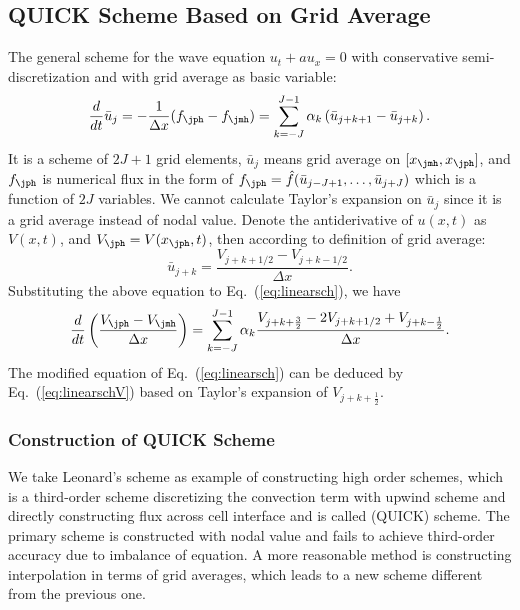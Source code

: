 \documentclass[]{article}
\begin{document}
\subsection{QUICK Scheme Based on Grid Average} \label{sec:quick-scheme-based}

The general scheme for the wave equation $u_t+a u_x=0$ with
conservative semi-discretization and with grid average as basic variable:
\begin{equation}
  \frac{d}{dt}\bar u_j = -\frac{1}{\Delta x}(f_{\jph}-f_{\jmh})=\sum_{k=-J}^{J-1}\alpha_k\left(\bar u_{j+k+1}-\bar u_{j+k}\right).
  \label{eq:linearsch}
\end{equation}
It is a scheme of $2J+1$ grid elements, $\bar u_j$ means grid
average on $[x_{\jmh}, x_\jph]$, and $f_\jph$ is numerical flux in the
form of $f_{\jph} = \hat f(\bar u_{j-J+1},\ldots,\bar u_{j+J})$ which
is a function of $2J$ variables.
We cannot calculate Taylor's expansion on $\bar u_j$ since it is a
grid average instead of nodal value. Denote the antiderivative of
$u(x,t)$ as $V(x,t)$, and $V_\jph = V(x_\jph,t)$, then according to
definition of grid average:
\begin{equation}
  \bar u_{j+k}=\frac{V_{j+k+1/2}-V_{j+k-1/2}}{\Delta x}.
  \label{eq:ujkV}
\end{equation}
Substituting the above equation to Eq.~(\ref{eq:linearsch}), we have 
\begin{equation}
  \frac{d}{dt}\left(\frac{V_{\jph}-V_{\jmh}}{\Delta x}\right)=\sum_{k=-J}^{J-1}\alpha_k\frac{V_{j+k+\frac{3}{2}}-2V_{j+k+1/2}+V_{j+k-\frac{1}{2}}}{\Delta x}.
  \label{eq:linearschV}
\end{equation}
The modified equation of Eq.~(\ref{eq:linearsch}) can be deduced by
Eq.~(\ref{eq:linearschV}) based on Taylor's expansion of $V_{j+k+\frac 12}$.

\subsubsection{Construction of QUICK Scheme} \label{sec:construct-quick}

We take Leonard's scheme \cite{leonard1979stable}
as example of constructing high order schemes, which is a third-order scheme
discretizing the convection term with upwind scheme and directly constructing
flux across cell interface and is called (QUICK) scheme.
The primary scheme is constructed with nodal value
and fails to achieve third-order accuracy due to imbalance of equation.
A more reasonable method is constructing interpolation in terms of grid 
averages,
which leads to a new scheme different from the previous one.
\end{document}
